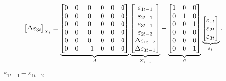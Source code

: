 \documentclass[a4paper,12pt]{article}
\begin{document}
\begin{align}
{\begin{bmatrix}
\Delta \varepsilon _{3t}%
\end{bmatrix}%
}_{X_{t}}& =\underbrace{%
\begin{bmatrix}
0 & 0 & 0 & 0 & 0 & 0 \\ 
0 & 0 & 0 & 0 & 0 & 0 \\ 
0 & 0 & 0 & 0 & 0 & 0 \\ 
0 & 0 & 0 & 0 & 0 & 0 \\ 
0 & 0 & 0 & 0 & 0 & 0 \\ 
0 & 0 & -1 & 0 & 0 & 0%
\end{bmatrix}%
}_{A}\underbrace{%
\begin{bmatrix}
\varepsilon _{1t-1} \\ 
\varepsilon _{2t-1} \\ 
\varepsilon _{3t-1} \\ 
\varepsilon _{2t-3} \\ 
\Delta \varepsilon _{1t-2} \\ 
\Delta \varepsilon _{3t-1}%
\end{bmatrix}%
}_{X_{t-1}}+\underbrace{%
\begin{bmatrix}
1 & 0 & 0 \\ 
0 & 1 & 0 \\ 
0 & 0 & 1 \\ 
0 & 0 & 0 \\ 
0 & 0 & 0 \\ 
0 & 0 & 1%
\end{bmatrix}%
}_{C}\underbrace{%
\begin{bmatrix}
\varepsilon _{1t} \\ 
\varepsilon _{2t} \\ 
\varepsilon _{3t}%
\end{bmatrix}%
}_{\varepsilon _{t}}.
\end{align}%
\bigskip

\bigskip $\varepsilon _{1t-1}-\varepsilon _{1t-2}$
\end{document}
